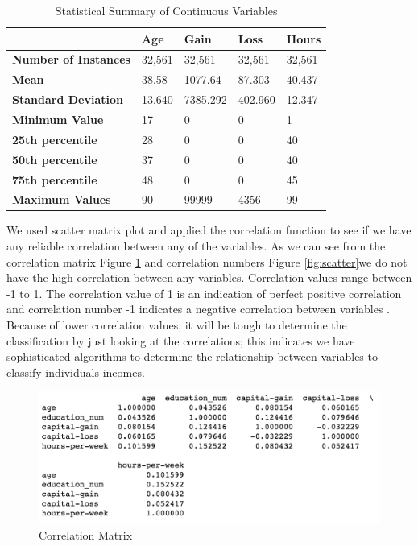 \documentclass[sigconf]{acmart}
\begin{document}
\begin{table}[!ht]
\centering
\begin{tabular}{|l|l|l|l|l|}
\hline
                    & \textbf{Age} & \textbf{Gain} & \textbf{Loss} & \textbf{Hours} \\ \hline
\textbf{Number of Instances} & 32,561 & 32,561       & 32,561       & 32,561         \\ \hline
\textbf{Mean}                & 38.58  & 1077.64      & 87.303       & 40.437         \\ \hline
\textbf{Standard Deviation}  & 13.640 & 7385.292     & 402.960      & 12.347         \\ \hline
\textbf{Minimum Value}       & 17     & 0            & 0            & 1              \\ \hline
\textbf{25th percentile}     & 28     & 0            & 0            & 40             \\ \hline
\textbf{50th percentile}     & 37     & 0            & 0            & 40             \\ \hline
\textbf{75th percentile}     & 48     & 0            & 0            & 45             \\ \hline
\textbf{Maximum Values}      & 90     & 99999        & 4356         & 99             \\ \hline
\end{tabular}
\caption{Statistical Summary of Continuous Variables \cite{Borga2017}}
\label{my-label}
\end{table}

\par We used scatter matrix plot and applied the correlation function to see if we have any reliable correlation between any of the variables. As we can see from the correlation matrix Figure \ref{fig:scatter-matrix} and correlation numbers Figure \ref{fig:scatter}we do not have the high correlation between any variables. Correlation values range between -1 to 1. The correlation value of 1 is an indication of perfect positive correlation and correlation number -1 indicates a negative correlation between variables \cite{www-investopedia}. Because of lower correlation values, it will be tough to determine the classification by just looking at the correlations; this indicates we have sophisticated algorithms to determine the relationship between variables to classify individuals incomes. 

 \begin{figure}[!ht]
  \centering
      \includegraphics[width=\columnwidth]{images/scatter.png}
  \caption{Correlation Matrix \cite{Borga2017}}\label{fig:scatter-matrix}
\end{figure}
\end{document}
